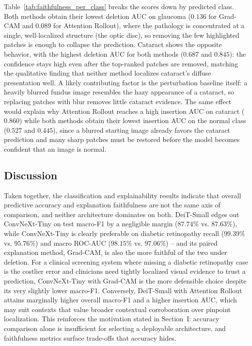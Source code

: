 Table~\ref{tab:faithfulness_per_class} breaks the scores down by predicted class.
Both methods obtain their lowest deletion AUC on glaucoma ($0.136$ for Grad-CAM and $0.089$ for Attention Rollout), where the pathology is concentrated at a single, well-localized structure (the optic disc), so removing the few highlighted patches is enough to collapse the prediction.
Cataract shows the opposite behavior, with the highest deletion AUC for both methods ($0.687$ and $0.845$): the confidence stays high even after the top-ranked patches are removed, matching the qualitative finding that neither method localizes cataract's diffuse presentation well.
A likely contributing factor is the perturbation baseline itself: a heavily blurred fundus image resembles the hazy appearance of a cataract, so replacing patches with blur removes little cataract evidence.
The same effect would explain why Attention Rollout reaches a high insertion AUC on cataract ($0.860$) while both methods obtain their lowest insertion AUC on the normal class ($0.527$ and $0.445$), since a blurred starting image already favors the cataract prediction and many sharp patches must be restored before the model becomes confident that an image is normal.

\subsection{Discussion}

Taken together, the classification and explainability results indicate that overall predictive accuracy and explanation faithfulness are not the same axis of comparison, and neither architecture dominates on both.
DeiT-Small edges out ConvNeXt-Tiny on test macro-F1 by a negligible margin ($87.74\%$ vs. $87.63\%$), while ConvNeXt-Tiny is clearly preferable on diabetic retinopathy recall ($99.39\%$ vs. $95.76\%$) and macro ROC-AUC ($98.15\%$ vs. $97.06\%$) -- and its paired explanation method, Grad-CAM, is also the more faithful of the two under deletion.
For a clinical screening system where missing a diabetic retinopathy case is the costlier error and clinicians need tightly localized visual evidence to trust a prediction, ConvNeXt-Tiny with Grad-CAM is the more defensible choice despite its very slightly lower macro-F1.
Conversely, DeiT-Small with Attention Rollout attains marginally higher overall macro-F1 and a higher insertion AUC, which may suit contexts that value broader contextual corroboration over pinpoint localization.
This reinforces the motivation stated in Section~I: accuracy comparison alone is insufficient for selecting a deployable architecture, and faithfulness metrics surface trade-offs that accuracy hides.

